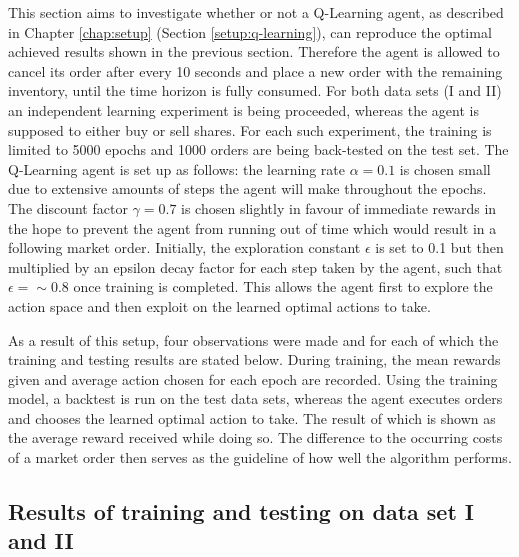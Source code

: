 This section aims to investigate whether or not a Q-Learning agent, as described in Chapter \ref{chap:setup} (Section \ref{setup:q-learning}), can reproduce the optimal achieved results shown in the previous section.
Therefore the agent is allowed to cancel its order after every 10 seconds and place a new order with the remaining inventory, until the time horizon is fully consumed.
For both data sets (I and II) an independent learning experiment is being proceeded, whereas the agent is supposed to either buy or sell shares.
For each such experiment, the training is limited to 5000 epochs and 1000 orders are being back-tested on the test set.
The Q-Learning agent is set up as follows:
the learning rate $\alpha=0.1$ is chosen small due to extensive amounts of steps the agent will make throughout the epochs.
The discount factor $\gamma=0.7$ is chosen slightly in favour of immediate rewards in the hope to prevent the agent from running out of time which would result in a following market order.
Initially, the exploration constant $\epsilon$ is set to 0.1 but then multiplied by an epsilon decay factor for each step taken by the agent, such that $\epsilon=\sim0.8$ once training is completed.
This allows the agent first to explore the action space and then exploit on the learned optimal actions to take.

As a result of this setup, four observations were made and for each of which the training and testing results are stated below.
During training, the mean rewards given and average action chosen for each epoch are recorded.
Using the training model, a backtest is run on the test data sets, whereas the agent executes orders and chooses the learned optimal action to take.
The result of which is shown as the average reward received while doing so.
The difference to the occurring costs of a market order then serves as the guideline of how well the algorithm performs.

\subsection{Results of training and testing on data set I and II}

